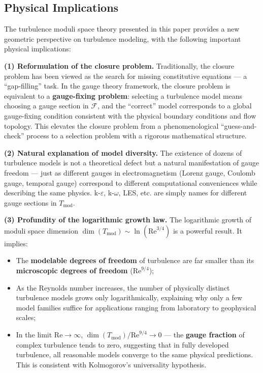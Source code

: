\documentclass[12pt,a4paper]{article}
\theoremstyle{plain}
\theoremstyle{definition}
\theoremstyle{remark}
\newcommand{\F}{\mathcal{F}}
\newcommand{\Tmod}{T_{\text{mod}}}
\newcommand{\ReNum}{\mathrm{Re}}
\newcommand{\eps}{\varepsilon}
\begin{document}
\subsection{Physical Implications}

The turbulence moduli space theory presented in this paper provides a new geometric perspective on turbulence modeling, with the following important physical implications:

\textbf{(1) Reformulation of the closure problem.} Traditionally, the closure problem has been viewed as the search for missing constitutive equations --- a ``gap-filling'' task. In the gauge theory framework, the closure problem is equivalent to a \textbf{gauge-fixing problem}: selecting a turbulence model means choosing a gauge section in $\F$, and the ``correct'' model corresponds to a global gauge-fixing condition consistent with the physical boundary conditions and flow topology. This elevates the closure problem from a phenomenological ``guess-and-check'' process to a selection problem with a rigorous mathematical structure.

\textbf{(2) Natural explanation of model diversity.} The existence of dozens of turbulence models is not a theoretical defect but a natural manifestation of gauge freedom --- just as different gauges in electromagnetism (Lorenz gauge, Coulomb gauge, temporal gauge) correspond to different computational conveniences while describing the same physics. k-$\eps$, k-$\omega$, LES, etc. are simply names for different gauge sections in $\Tmod$.

\textbf{(3) Profundity of the logarithmic growth law.} The logarithmic growth of moduli space dimension $\dim(\Tmod) \sim \ln(\ReNum^{3/4})$ is a powerful result. It implies:
\begin{itemize}
    \item The \textbf{modelable degrees of freedom} of turbulence are far smaller than its \textbf{microscopic degrees of freedom} ($\ReNum^{9/4}$);
    \item As the Reynolds number increases, the number of physically distinct turbulence models grows only logarithmically, explaining why only a few model families suffice for applications ranging from laboratory to geophysical scales;
    \item In the limit $\ReNum\to\infty$, $\dim(\Tmod)/\ReNum^{9/4}\to0$ --- the \textbf{gauge fraction} of complex turbulence tends to zero, suggesting that in fully developed turbulence, all reasonable models converge to the same physical predictions. This is consistent with Kolmogorov's universality hypothesis.
\end{itemize}
\end{document}
